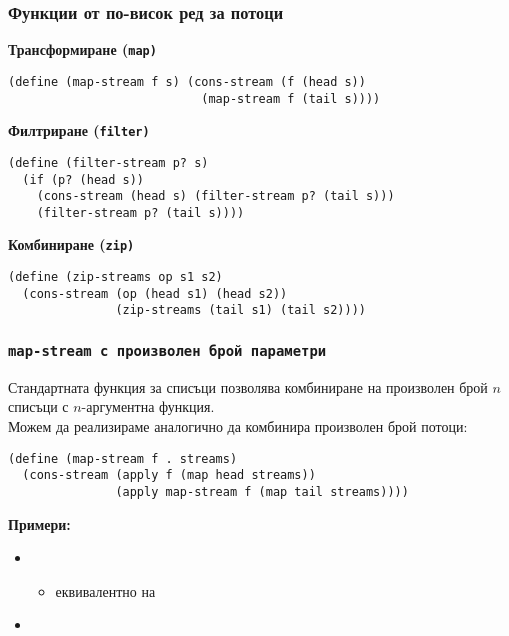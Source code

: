 \documentclass[alsotrans]{beamerswitch}
\begin{document}
\begin{frame}[fragile]
  \frametitle{Функции от по-висок ред за потоци}

  \textbf{Трансформиране (\tt{map})}
\begin{lstlisting}
(define (map-stream f s) (cons-stream (f (head s))
                           (map-stream f (tail s))))
\end{lstlisting}
  \pause
  \textbf{Филтриране (\tt{filter})}
\begin{lstlisting}
(define (filter-stream p? s)
  (if (p? (head s))
    (cons-stream (head s) (filter-stream p? (tail s)))
    (filter-stream p? (tail s))))
\end{lstlisting}
  \pause
  \textbf{Комбиниране (\tt{zip})}
\begin{lstlisting}
(define (zip-streams op s1 s2)
  (cons-stream (op (head s1) (head s2))
               (zip-streams (tail s1) (tail s2))))
\end{lstlisting}
\end{frame}

\begin{frame}[fragile]
  \frametitle{\tt{map-stream} с произволен брой параметри}

  Стандартната функция  за списъци позволява комбиниране на произволен брой $n$ списъци с $n$-аргументна функция.\\
  \pause
  Можем да реализираме  аналогично да комбинира произволен брой потоци:\\
  \pause
\begin{lstlisting}
(define (map-stream f . streams)
  (cons-stream (apply f (map head streams))
               (apply map-stream f (map tail streams))))
\end{lstlisting}
  \pause
  \textbf{Примери:}
  \begin{itemize}[<+->]
  \item {}
    \begin{itemize}
    \item еквивалентно на 
    \end{itemize}
  \item {}
  \end{itemize}
\end{frame}
\end{document}
